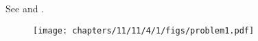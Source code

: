 See 
and
.
\begin{figure}[H]
	\begin{center}
		\texttt{[image: chapters/11/11/4/1/figs/problem1.pdf]}
	\end{center}
\caption{}
\label{fig:11/11/4/1Fig1}
\end{figure}
